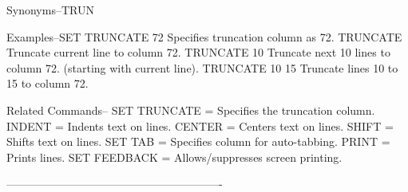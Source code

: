 Synonyms--TRUN
 
Examples--SET TRUNCATE 72    Specifies truncation column as 72.
          TRUNCATE           Truncate current line to column 72.
          TRUNCATE 10        Truncate next 10 lines to column 72.
                             (starting with current line).
          TRUNCATE 10 15     Truncate lines 10 to 15 to column 72.
 
Related Commands--
          SET TRUNCATE    = Specifies the truncation column.
          INDENT          = Indents text on lines.
          CENTER          = Centers text on lines.
          SHIFT           = Shifts text on lines.
          SET TAB         = Specifies column for auto-tabbing.
          PRINT           = Prints lines.
          SET FEEDBACK    = Allows/suppresses screen printing.
 
----------------------------------------------------------
 
 
 
 
 
 
 
 
 
 
 
 
 
 
 
 
 
 
 
 
 
 
 
 
 
 
 
 
 
 
 
 
 
 
 
 
 
 
 
 
 
 
 
 
 
 
 
 
 
 
 
 
 
 
 
 
 
 
 
 
 
 
 
 
 
 
 
 
 
 
 
 
 
 
 
 
 
